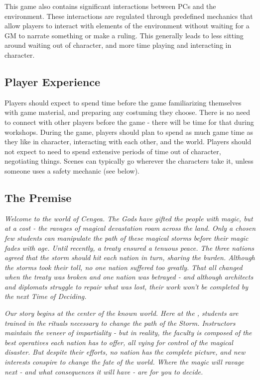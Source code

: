 \documentclass[sheet]{GL2020}
\begin{document}
This game also contains significant interactions between PCs and the environment. These interactions are regulated through predefined mechanics that allow players to interact with elements of the environment without waiting for a GM to narrate something or make a ruling. This generally leads to less sitting around waiting out of character, and more time playing and interacting in character. 

\subsection{Player Experience}
Players should expect to spend time before the game familiarizing themselves with game material, and preparing any costuming they choose. There is no need to connect with other players before the game - there will be time for that during workshops. During the game, players should plan to spend as much game time as they like in character, interacting with each other, and the world. Players should not expect to need to spend extensive periods of time out of character, negotiating things. Scenes can typically go wherever the characters take it, unless someone uses a safety mechanic (see below).


\subsection{The Premise}
\emph{Welcome to the world of Cengea. The Gods have gifted the people with magic, but at a cost - the ravages of magical devastation roam across the land. Only a chosen few students can manipulate the path of these magical storms before their magic fades with age. Until recently, a treaty ensured a tenuous peace. The three nations agreed that the storm should hit each nation in turn, sharing the burden. Although the storms took their toll, no one nation suffered too greatly. That all changed when the treaty was broken and one nation was betrayed - and although architects and diplomats struggle to repair what was lost, their work won’t be completed by the next Time of Deciding.}

\emph{Our story begins at the center of the known world. Here at the \pSchool{}, students are trained in the rituals necessary to change the path of the Storm. Instructors maintain the veneer of impartiality - but in reality, the faculty is composed of the best operatives each nation has to offer, all vying for control of the magical disaster. But despite their efforts, no nation has the complete picture, and new interests conspire to change the fate of the world. Where the magic will ravage next - and what consequences it will have - are for you to decide.}
\end{document}

